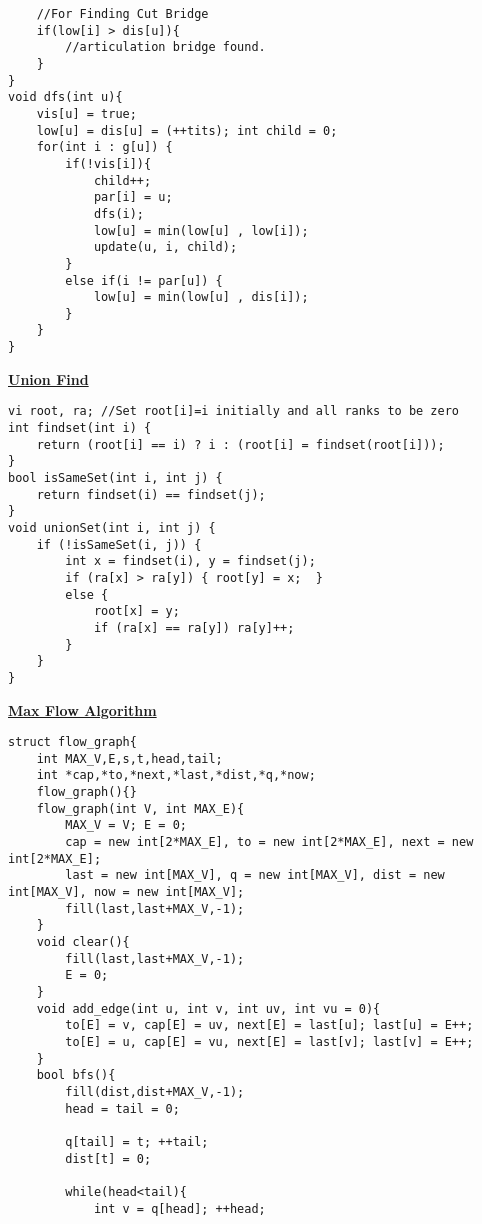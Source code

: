 \documentclass[10pt,a4paper]{report}
\begin{document}
\begin{landscape}
\begin{multicols}{2}
\begin{verbatim}
    //For Finding Cut Bridge
    if(low[i] > dis[u]){
        //articulation bridge found.
    }
}
void dfs(int u){
    vis[u] = true;
    low[u] = dis[u] = (++tits); int child = 0;
    for(int i : g[u]) {
        if(!vis[i]){
            child++;
            par[i] = u;
            dfs(i);
            low[u] = min(low[u] , low[i]);
            update(u, i, child);
        }
        else if(i != par[u]) {
            low[u] = min(low[u] , dis[i]);
        }
    }
}
\end{verbatim}

\begin{flushleft}
\textbf{\underline{Union Find}}
\end{flushleft}

\begin{verbatim}
vi root, ra; //Set root[i]=i initially and all ranks to be zero 
int findset(int i) {
	return (root[i] == i) ? i : (root[i] = findset(root[i]));
}
bool isSameSet(int i, int j) {
	return findset(i) == findset(j);
}
void unionSet(int i, int j) { 
	if (!isSameSet(i, j)) {
		int x = findset(i), y = findset(j);
		if (ra[x] > ra[y]) { root[y] = x;  }
		else { 
			root[x] = y;
			if (ra[x] == ra[y]) ra[y]++; 
		}
	}
}
\end{verbatim}

\begin{flushleft}
\textbf{\underline{Max Flow Algorithm}}
\end{flushleft}

\begin{verbatim}
struct flow_graph{
    int MAX_V,E,s,t,head,tail;
    int *cap,*to,*next,*last,*dist,*q,*now;
    flow_graph(){}
    flow_graph(int V, int MAX_E){
        MAX_V = V; E = 0;
        cap = new int[2*MAX_E], to = new int[2*MAX_E], next = new int[2*MAX_E];
        last = new int[MAX_V], q = new int[MAX_V], dist = new int[MAX_V], now = new int[MAX_V];
        fill(last,last+MAX_V,-1);
    }
    void clear(){
        fill(last,last+MAX_V,-1);
        E = 0;
    }
    void add_edge(int u, int v, int uv, int vu = 0){
        to[E] = v, cap[E] = uv, next[E] = last[u]; last[u] = E++;
        to[E] = u, cap[E] = vu, next[E] = last[v]; last[v] = E++;
    }
	bool bfs(){
		fill(dist,dist+MAX_V,-1);
		head = tail = 0;
		
		q[tail] = t; ++tail;
		dist[t] = 0;
		
		while(head<tail){
			int v = q[head]; ++head;
			

\end{verbatim}
\end{multicols}
\end{landscape}
\end{document}
